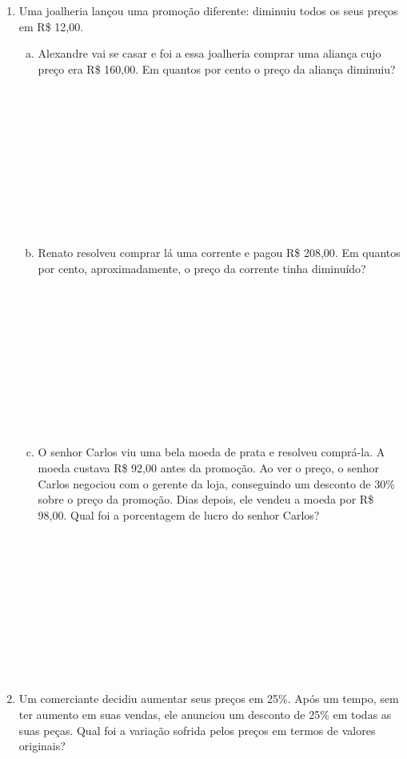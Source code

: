 \documentclass[a4paper,14pt]{article}
\begin{document}
\begin{multicols}{2}
\begin{enumerate}
			\item Uma joalheria lançou uma promoção diferente: diminuiu todos os seus preços em R\$ 12,00.
			\begin{enumerate}[a)]
				\item Alexandre vai se casar e foi a essa joalheria comprar uma aliança cujo preço era R\$ 160,00. Em quantos por cento o preço da aliança diminuiu? \\\\\\\\\\\\\\\\\\\\\\
				\item Renato resolveu comprar lá uma corrente e pagou R\$ 208,00. Em quantos por cento, aproximadamente, o preço da corrente tinha diminuído? \\\\\\\\\\\\\\\\\\\\\\
				\item O senhor Carlos viu uma bela moeda de prata e resolveu comprá-la. A moeda custava R\$ 92,00 antes da promoção. Ao ver o preço, o senhor Carlos negociou com o gerente da loja, conseguindo um desconto de 30\% sobre o preço da promoção. Dias depois, ele vendeu a moeda por R\$ 98,00. Qual foi a porcentagem de lucro do senhor Carlos? \\\\\\\\\\\\\\\\\\\\\\
			\end{enumerate}
			\item Um comerciante decidiu aumentar seus preços em 25\%. Após um tempo, sem ter aumento em suas vendas, ele anunciou um desconto de 25\% em todas as suas peças. Qual foi a variação sofrida pelos preços em termos de valores originais? \\\\\\\\\\\\\\\\\\\\\\

\end{enumerate}
\end{multicols}
\end{document}
